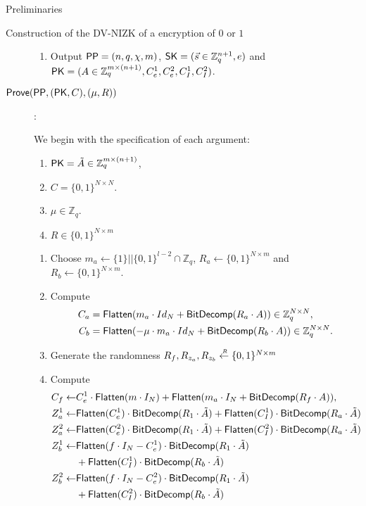 \begin{section}{Preliminaries}
\begin{subsection}{Construction of the DV-NIZK of a encryption of $0$ or $1$}
\begin{description}
\begin{enumerate}
        \item Output ${\mathsf{PP}} = (n, q, \chi, m)$, $\mathsf{SK} = (\vec{s} \in \mathbb{Z}_q^{n+1}, e)$ and $\mathsf{PK} = (A \in \mathbb{Z}_q^{m \times (n+1)}, C_e^1, C_e^2, C_I^1, C_I^2)$.
        \end{enumerate}


      \item[${\mathsf{Prove}}({\mathsf{PP}}, (\mathsf{PK}, C), (\mu, R))$]:

        We begin with the specification of each argument:
        \begin{enumerate}
        \item $\mathsf{PK} = \tilde{A} \in\mathbb{Z}_q^{m \times (n+1)}$,
        \item $C = \{0,1\}^{N \times N}$.
        \item $\mu \in \mathbb{Z}_q$.
        \item $R \in \{0,1\}^{N \times m}$
        \end{enumerate}

        \begin{enumerate}
        \item Choose $m_a \gets \{1\}||\{0,1\}^{l-2} \cap \mathbb{Z}_q$, $R_a \gets \{0,1\}^{N \times m}$ and $R_b \gets \{0,1\}^{N \times m}$.
        \item Compute
          \begin{align*}
            C_a  &= {\mathsf{Flatten}}(m_a \cdot Id_{N} + {\mathsf{BitDecomp}}(R_a \cdot A)) \in \mathbb{Z}_q^{N \times N}, \\
            C_b  &= {\mathsf{Flatten}}(-\mu \cdot m_a \cdot Id_{N} + {\mathsf{BitDecomp}}(R_b \cdot A)) \in \mathbb{Z}_q^{N \times N}.
          \end{align*}

        \item Generate the randomness $R_f, R_{z_a}, R_{z_b} \stackrel{{\scriptscriptstyle \mkern4mu R}}{\gets} \{0,1\}^{N \times m}$

        \item Compute 
          \begin{align*}
            C_f \gets& C_e^1 \cdot  {\mathsf{Flatten}}(m \cdot I_N) + {\mathsf{Flatten}}(m_a \cdot I_N + {\mathsf{BitDecomp}}(R_f \cdot A)), \\
            Z_a^1 \gets& {\mathsf{Flatten}}(C_e^1) \cdot {\mathsf{BitDecomp}}(R_1 \cdot \tilde{A}) + {\mathsf{Flatten}}(C_I^1) \cdot {\mathsf{BitDecomp}}(R_a \cdot \tilde{A})\\
            Z_a^2 \gets& {\mathsf{Flatten}}(C_e^2) \cdot {\mathsf{BitDecomp}}(R_1 \cdot \tilde{A}) + {\mathsf{Flatten}}(C_I^2) \cdot {\mathsf{BitDecomp}}(R_a \cdot \tilde{A})\\
            Z_b^1 \gets& {\mathsf{Flatten}}(f \cdot I_N - C_e^1) \cdot {\mathsf{BitDecomp}}(R_1 \cdot \tilde{A}) \\
                     & + {\mathsf{Flatten}}(C_I^1) \cdot {\mathsf{BitDecomp}}(R_b \cdot \tilde{A})\\
            Z_b^2 \gets& {\mathsf{Flatten}}(f \cdot I_N - C_e^2) \cdot {\mathsf{BitDecomp}}(R_1 \cdot \tilde{A}) \\
                     & + {\mathsf{Flatten}}(C_I^2) \cdot {\mathsf{BitDecomp}}(R_b \cdot \tilde{A})
          \end{align*}
          

\end{enumerate}
\end{description}
\end{subsection}
\end{section}
